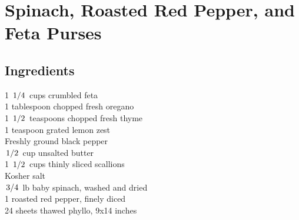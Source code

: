 \documentclass{article}
\begin{document}
\newcommand{\slfrac}[2]{\left.#1\middle/#2\right.}
\newcommand{\degree}{\ensuremath{^\circ}}

\section*{Spinach, Roasted Red Pepper, and Feta Purses}



\subsection*{Ingredients}
1 $\slfrac{1}{4}$ cups crumbled feta\\
1 tablespoon chopped fresh oregano\\
1 $\slfrac{1}{2}$ teaspoons chopped fresh thyme\\
1 teaspoon grated lemon zest\\
Freshly ground black pepper\\
$\slfrac{1}{2}$ cup unsalted butter\\
1 $\slfrac{1}{2}$ cups thinly sliced scallions\\
Kosher salt\\
$\slfrac{3}{4}$ lb baby spinach, washed and dried\\
1 roasted red pepper, finely diced\\
24 sheets thawed phyllo, 9x14 inches\\
\end{document}
